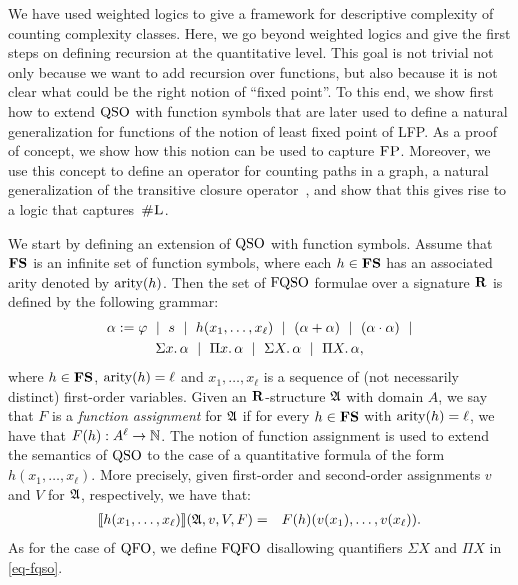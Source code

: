 
We have used weighted logics to give a framework for descriptive complexity of counting complexity classes. Here, we go beyond weighted logics 
and give the first steps on defining recursion at the quantitative level.
This goal is not trivial not only because we want to add recursion over functions, but also because 
it is not clear what could be the right notion of ``fixed point''. 
To this end, we show first how to extend ${\rm QSO}$ with function symbols that are later
used 
to define a natural generalization for functions of 
the notion of least fixed point of LFP.
 As a proof of concept, we show how this notion can be used to capture $\text{\sc FP}$.
Moreover, we use this concept
to define an operator for counting paths in a graph, a natural generalization of the transitive closure operator~\cite{immerman1999descriptive}, and show that this gives rise to a logic that captures~$\text{\sc \#L}$. 

We start
by defining an extension of ${\rm QSO}$ with function symbols. Assume that $\mathbf{FS}$ is an infinite set of function symbols, where each $h \in \mathbf{FS}$ has an associated arity
denoted by ${\rm arity}(h)$. Then the set of ${\rm FQSO}$ formulae over a signature $\mathbf{R}$ is defined by the following grammar:
\begin{multline}
\label{eq-fqso}
	\alpha := \varphi \ \mid \  s \  \mid \  h(x_1, \ldots, x_\ell) \  \mid \
	(\alpha \add \alpha) \  \mid\  (\alpha \mult \alpha) \  \mid \\  
	\sa{x} \alpha \  \mid \
	\pa{x} \alpha \  \mid \
	\sa{X} \alpha \  \mid \
	\pa{X} \alpha,
\end{multline}
where $h \in \mathbf{FS}$, ${\rm arity}(h) = \ell$ and $x_1, \ldots, x_\ell$ is a sequence of (not necessarily distinct) first-order variables. Given an $\mathbf{R}$-structure $\mathfrak{A}$ with domain $A$, we say that $F$ is a \emph{function assignment} for $\mathfrak{A}$ if for every $h \in \mathbf{FS}$ with ${\rm arity}(h) = \ell$, we have that $F(h) :  A^\ell \to \mathbb{N}$. The notion of function assignment is used to extend the semantics of ${\rm QSO}$ to the case of a quantitative formula of the form $h(x_1, \ldots, x_\ell)$. More precisely, given first-order and second-order assignments $v$ and $V$ for $\mathfrak{A}$, respectively, 
we have that:
\begin{eqnarray*}
{\llbracket{}{h(x_1, \ldots, x_\ell)}\rrbracket}(\mathfrak{A},v,V,F) & = & F(h)(v(x_1),\ldots, v(x_\ell)).
\end{eqnarray*}
As for the case of ${\rm QFO}$, we define ${\rm FQFO}$ disallowing quantifiers $\Sigma X$ and $\Pi X$ in \eqref{eq-fqso}.

